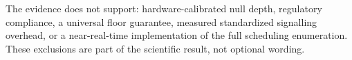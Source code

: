 \documentclass[journal]{IEEEtran}
\begin{document}
The evidence does not support: hardware-calibrated null depth, regulatory compliance, a universal floor guarantee, measured standardized signalling overhead, or a near-real-time implementation of the full scheduling enumeration. These exclusions are part of the scientific result, not optional wording.

\balance

\end{document}
